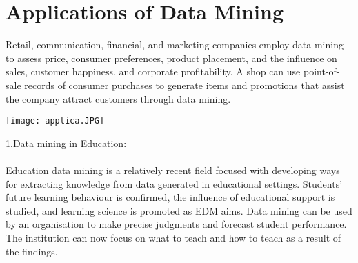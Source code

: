 \documentclass[12pt,letterpaper]{article}
\begin{document}
\section{Applications of Data Mining}
Retail, communication, financial, and marketing companies employ data mining to assess price, consumer preferences, product placement, and the influence on sales, customer happiness, and corporate profitability. A shop can use point-of-sale records of consumer purchases to generate items and promotions that assist the company attract customers through data mining.\\
\begin{center} \texttt{[image: applica.JPG]}
\end{center}
1.Data mining in Education:\\
\\
Education data mining is a relatively recent field focused with developing ways for extracting knowledge from data generated in educational settings. Students' future learning behaviour is confirmed, the influence of educational support is studied, and learning science is promoted as EDM aims. Data mining can be used by an organisation to make precise judgments and forecast student performance. The institution can now focus on what to teach and how to teach as a result of the findings.\\
\end{document}
